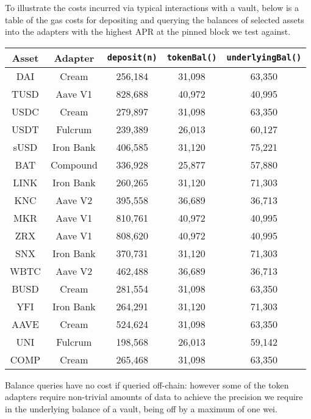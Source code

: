 \documentclass{article}
\begin{document}
To illustrate the costs incurred via typical interactions with a vault, below is a table of the gas costs for depositing and querying the balances of selected assets into the adapters with the highest APR at the pinned block we test against.

\begin{center}
     \begin{tabular}{|c|c|c|c|c|}
    \hline
    \textbf{Asset} & \textbf{Adapter} & \texttt{deposit(n)} & \texttt{tokenBal()} & \texttt{underlyingBal()} \\
    \hline
    DAI & Cream & 256,184 & 31,098 & 63,350\\
    \hline
    TUSD & Aave V1 & 828,688 & 40,972 & 40,995\\
    \hline
    USDC & Cream & 279,897 & 31,098 & 63,350\\
    \hline
    USDT & Fulcrum & 239,389 & 26,013 & 60,127\\
    \hline
    sUSD & Iron Bank & 406,585 & 31,120 & 75,221\\
    \hline
    BAT & Compound & 336,928 & 25,877 & 57,880\\
    \hline
    LINK & Iron Bank & 260,265 & 31,120 & 71,303\\
    \hline
    KNC & Aave V2 & 395,558 & 36,689 & 36,713\\
    \hline
    MKR & Aave V1 & 810,761 & 40,972 & 40,995\\
    \hline
    ZRX & Aave V1 & 808,620 & 40,972 & 40,995\\
    \hline
    SNX & Iron Bank & 370,731 & 31,120 & 71,303\\
    \hline
    WBTC & Aave V2 & 462,488 & 36,689 & 36,713\\
    \hline
    BUSD & Cream & 281,554 & 31,098 & 63,350\\
    \hline
    YFI & Iron Bank & 264,291 & 31,120 & 71,303\\
    \hline
    AAVE & Cream & 524,624 & 31,098 & 63,350\\
    \hline
    UNI & Fulcrum & 198,568 & 26,013 & 59,142\\
    \hline
    COMP & Cream & 265,468 & 31,098 & 63,350\\
    \hline
    \end{tabular}
\end{center}

\noindent
Balance queries have no cost if queried off-chain: however some of the token adapters require non-trivial amounts of data to achieve the precision we require in the underlying balance of a vault, being off by a maximum of one wei.\\
\end{document}
